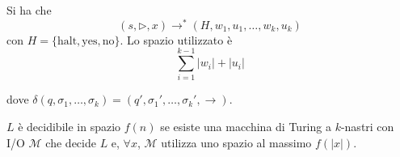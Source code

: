 \begin{definition}
    Si ha che
    $$
        (s,\rhd,x) \to^* (H,w_1,u_1,\dots,w_k,u_k)
    $$
    con $H=\{\text{halt},\text{yes},\text{no}\}$. Lo spazio utilizzato è
    $$
        \sum_{i=1}^{k-1} |w_i| + |u_i|
    $$
\end{definition}
dove $\delta(q,\sigma_1,\dots,\sigma_k)=(q',\sigma_1',\dots,\sigma_k',\to)$.

\begin{definition}
    $L$ è decidibile in spazio $f(n)$ se esiste una macchina di Turing a $k$-nastri con I/O $\mathcal{M}$ che decide $L$ e, $\forall x$, $\mathcal{M}$ utilizza uno spazio al massimo $f(|x|)$.
\end{definition}

